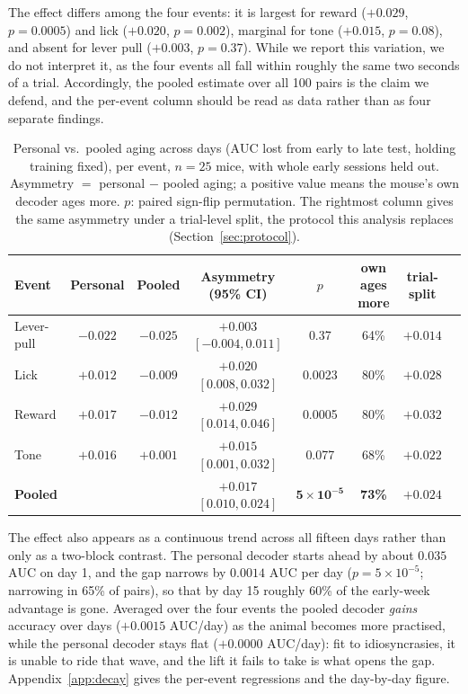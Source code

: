 \documentclass[mlmain,onecolumn]{jmlr}
\newcommand{\auc}{\mathrm{AUC}}
\begin{document}
The effect differs among the four events: it is largest for reward ($+0.029$, $p = 0.0005$) and lick
($+0.020$, $p = 0.002$), marginal for tone ($+0.015$, $p = 0.08$), and absent for lever pull
($+0.003$, $p = 0.37$). While we report this variation, we do not interpret it, as the four events
all fall within roughly the same two seconds of a trial. Accordingly, the pooled estimate over all
100 pairs is the claim we defend, and the per-event column should be read as data rather than as
four separate findings.

\begin{table}[t]\centering
\caption{Personal vs.\ pooled aging across days ($\auc$ lost from early to late test, holding
training fixed), per event, $n = 25$ mice, with whole early sessions held out. Asymmetry $=$
personal $-$ pooled aging; a positive value means the mouse's own decoder ages more. $p$: paired
sign-flip permutation. The rightmost column gives the same asymmetry under a trial-level split, the
protocol this analysis replaces (Section~\ref{sec:protocol}).}
\label{tab:asym}
\setlength{\tabcolsep}{4pt}
\begin{tabular}{lccccccc}
\toprule
Event & Personal & Pooled & Asymmetry (95\% CI) & $p$ & own ages more & trial-split \\
\midrule
Lever-pull & $-0.022$ & $-0.025$ & $+0.003$ $[-0.004, 0.011]$ & 0.37 & 64\% & $+0.014$ \\
Lick       & $+0.012$ & $-0.009$ & $+0.020$ $[0.008, 0.032]$ & 0.0023 & 80\% & $+0.028$ \\
Reward     & $+0.017$ & $-0.012$ & $+0.029$ $[0.014, 0.046]$ & 0.0005 & 80\% & $+0.032$ \\
Tone       & $+0.016$ & $+0.001$ & $+0.015$ $[0.001, 0.032]$ & 0.077 & 68\% & $+0.022$ \\
\midrule
\textbf{Pooled} & & & $\mathbf{+0.017}$ $[0.010, 0.024]$ & $\mathbf{5\times10^{-5}}$ & \textbf{73\%} & $+0.024$ \\
\bottomrule
\end{tabular}
\end{table}

The effect also appears as a continuous trend across all fifteen days rather than only as a
two-block contrast. The personal decoder starts ahead by about $0.035$ $\auc$ on day 1, and the gap
narrows by $0.0014$ $\auc$ per day ($p = 5 \times 10^{-5}$; narrowing in 65\% of pairs), so that by
day 15 roughly 60\% of the early-week advantage is gone. Averaged over the four events the pooled
decoder \emph{gains} accuracy over days ($+0.0015$ $\auc$/day) as the animal becomes more practised,
while the personal decoder stays flat ($+0.0000$ $\auc$/day): fit to idiosyncrasies, it is unable to
ride that wave, and the lift it fails to take is what opens the gap. Appendix~\ref{app:decay} gives
the per-event regressions and the day-by-day figure.
\end{document}
